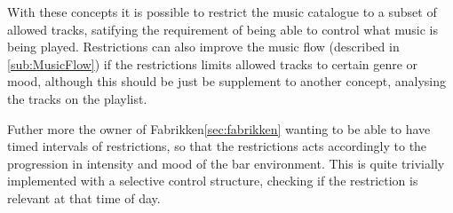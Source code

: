 With these concepts it is possible to restrict the music catalogue to a subset of allowed tracks, satifying the requirement of being able to control what music is being played. Restrictions can also improve the music flow (described in \cref{sub:MusicFlow}) if the restrictions limits allowed tracks to certain genre or mood, although this should be just be supplement to another concept, analysing the tracks on the playlist.

Futher more the owner of Fabrikken\cref{sec:fabrikken} wanting to be able to have timed intervals of restrictions, so that the restrictions acts accordingly to the progression in intensity and mood of the bar environment. This is quite trivially implemented with a selective control structure, checking if the restriction is relevant at that time of day.